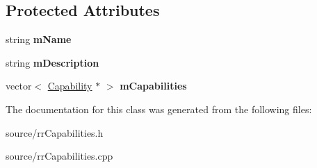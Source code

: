 \subsection*{Protected Attributes}
\begin{DoxyCompactItemize}
\item 
\hypertarget{classrr_1_1_capabilities_aee6b771409cf4265c90037bccf82405c}{string {\bfseries m\-Name}}\label{classrr_1_1_capabilities_aee6b771409cf4265c90037bccf82405c}

\item 
\hypertarget{classrr_1_1_capabilities_a77fbfe422aa069d0e968232f4fed36c1}{string {\bfseries m\-Description}}\label{classrr_1_1_capabilities_a77fbfe422aa069d0e968232f4fed36c1}

\item 
\hypertarget{classrr_1_1_capabilities_a0587169d0b45894ca015bb9a1f0271b5}{vector$<$ \hyperlink{classrr_1_1_capability}{Capability} $\ast$ $>$ {\bfseries m\-Capabilities}}\label{classrr_1_1_capabilities_a0587169d0b45894ca015bb9a1f0271b5}

\end{DoxyCompactItemize}


The documentation for this class was generated from the following files\-:\begin{DoxyCompactItemize}
\item 
source/rr\-Capabilities.\-h\item 
source/rr\-Capabilities.\-cpp\end{DoxyCompactItemize}
